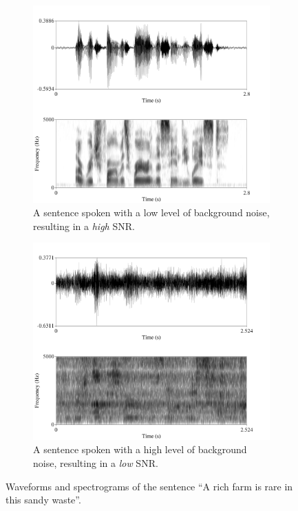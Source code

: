 \begin{figure}[h!]
\centering
\begin{subfigure}{0.75\textwidth}
  \includegraphics[width=.9\textwidth]{figure/signal-SNR-intro-high.png}
  \caption{A sentence spoken with a low level of background noise, resulting in a \textit{high} SNR.}
  \label{fig:signal-SNR-intro-high}
\end{subfigure}
%
\begin{subfigure}{0.75\textwidth}
  \includegraphics[width=.9\textwidth]{figure/signal-SNR-intro-low.png}
  \caption{A sentence spoken with a high level of background noise, resulting in a \textit{low} SNR.}
  \label{fig:signal-SNR-intro-low}
\end{subfigure}
\caption{Waveforms and spectrograms of the sentence ``A rich farm is rare in this sandy waste''.}
\label{fig:signal-SNR-intro}
\end{figure}

